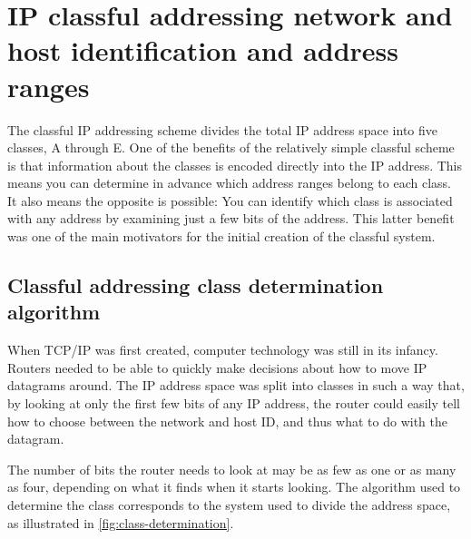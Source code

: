 \documentclass[b5paper,11pt]{memoir}
\begin{document}
\section{IP classful addressing network and host identification and address ranges}

The classful IP addressing scheme divides the total IP address space
into five classes, A through E. One of the benefits of the relatively
simple classful scheme is that information about the classes is encoded
directly into the IP address. This means you can determine in advance
which address ranges belong to each class. It also means the opposite is
possible: You can identify which class is associated with any address by
examining just a few bits of the address. This latter benefit was one of
the main motivators for the initial creation of the classful
system.\protect\hypertarget{ch17s02.htmlux5cux23idx-CHP-17-0685}{}{}


\subsection{Classful addressing class determination algorithm}

When TCP/IP was first created, computer technology was still in its
infancy. Routers needed to be able to quickly make decisions about how
to move IP datagrams around. The IP address space was split into classes
in such a way that, by looking at only the first few bits of any IP
address, the router could easily tell how to choose between the network
and host ID, and thus what to do with the datagram.

The number of bits the router needs to look at may be as few as one or
as many as four, depending on what it finds when it starts looking. The
algorithm used to determine the class corresponds to the system used to
divide the address space, as illustrated in \cref{fig:class-determination}.
\end{document}
